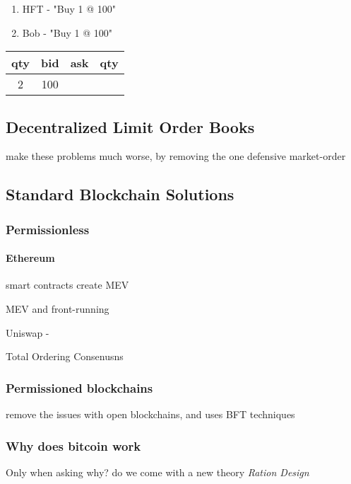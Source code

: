 \documentclass[12pt]{article}
\begin{document}
      \begin{enumerate}
        \item HFT - "Buy 1 @ 100"
        \item Bob - "Buy 1 @ 100"  
      \end{enumerate}
    
      \begin{center}
        \begin{tabular}{ |c|c|c|c| }
        \hline
        qty & bid & ask & qty \\
        \hline
        2 & 100 &  &  \\
        \hline
        \end{tabular}
      \end{center}
    
\subsection{Decentralized Limit Order Books} make these problems much worse, by removing the one defensive market-order 

\subsection{Standard Blockchain Solutions} 

\subsubsection{Permissionless} 

\paragraph*{Ethereum} smart contracts create MEV

MEV and front-running 

Uniswap - 

Total Ordering Consenusns 

\subsubsection{Permissioned blockchains} remove the issues with open blockchains, and uses BFT techniques 


\subsubsection{Why does bitcoin work} 
Only when asking why? do we come with a new theory \emph{Ration Design}
\end{document}
